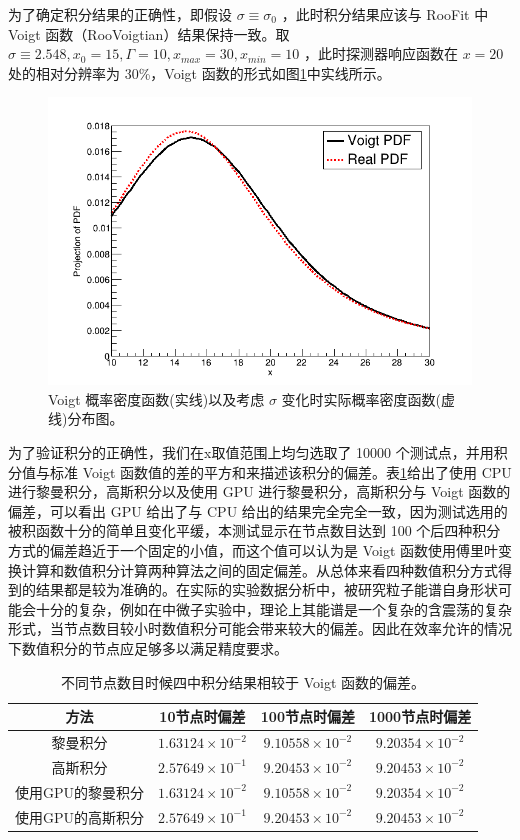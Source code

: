 为了确定积分结果的正确性，即假设 $\sigma \equiv \sigma_0$ ，此时积分结果应该与 RooFit 中 Voigt 函数（RooVoigtian）结果保持一致。取 $\sigma \equiv 2.548, x_0=15, \Gamma=10,x_{max}=30,x_{min}=10$ ，此时探测器响应函数在 $x=20$ 处的相对分辨率为 30\%，Voigt 函数的形式如图\ref{fig:cuda_com}中实线所示。

\begin{figure}
    \centering
    \includegraphics[width=0.6\columnwidth]{pic/cuda1.png}
    \caption{ Voigt 概率密度函数(实线)以及考虑 $\sigma$ 变化时实际概率密度函数(虚线)分布图。}
    \label{fig:cuda_com}
\end{figure}

为了验证积分的正确性，我们在x取值范围上均匀选取了 10000 个测试点，并用积分值与标准 Voigt 函数值的差的平方和来描述该积分的偏差。表\ref{tab:cuda_dif}给出了使用 CPU 进行黎曼积分，高斯积分以及使用 GPU 进行黎曼积分，高斯积分与 Voigt 函数的偏差，可以看出 GPU 给出了与 CPU 给出的结果完全完全一致，因为测试选用的被积函数十分的简单且变化平缓，本测试显示在节点数目达到 100 个后四种积分方式的偏差趋近于一个固定的小值，而这个值可以认为是 Voigt 函数使用傅里叶变换计算和数值积分计算两种算法之间的固定偏差。从总体来看四种数值积分方式得到的结果都是较为准确的。在实际的实验数据分析中，被研究粒子能谱自身形状可能会十分的复杂，例如在中微子实验中，理论上其能谱是一个复杂的含震荡的复杂形式，当节点数目较小时数值积分可能会带来较大的偏差。因此在效率允许的情况下数值积分的节点应足够多以满足精度要求。

\begin{table}
    \centering
    \begin{tabular*}{\textwidth}{@{\extracolsep{\fill}}cccc}
        \hline
        \hline							
        方法	&	10节点时偏差	&	100节点时偏差	&	1000节点时偏差	\\\hline
        黎曼积分	&	$1.63124\times10^{-2}$	&	$9.10558\times10^{-2}$	&	$9.20354\times10^{-2}$	\\
        高斯积分	&	$2.57649\times10^{-1}$	&	$9.20453\times10^{-2}$	&	$9.20453\times10^{-2}$	\\
        使用GPU的黎曼积分	&	$1.63124\times10^{-2}$	&	$9.10558\times10^{-2}$	&	$9.20354\times10^{-2}$	\\
        使用GPU的高斯积分	&	$2.57649\times10^{-1}$	&	$9.20453\times10^{-2}$	&	$9.20453\times10^{-2}$	\\
        \hline
        \hline
    \end{tabular*}
    \caption{不同节点数目时候四中积分结果相较于 Voigt 函数的偏差。}
    \label{tab:cuda_dif}
\end{table}

